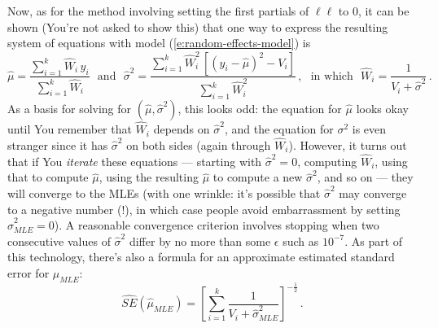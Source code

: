 \documentclass[12pt]{article}
\begin{document}
Now, as for the method involving setting the first partials of $\ell \ell$ to 0, it can be shown (You're not asked to show this) that one way to express the resulting system of equations with model (\ref{e:random-effects-model}) is
\begin{equation} \label{e:score-equations}
\hat{ \mu } = \frac{ \sum_{ i = 1 }^k \hat{ W }_i \, y_i }{ \sum_{ i = 1 }^k \hat{ W }_i } \ \ \ \textrm{and} \ \ \ \hat{ \sigma }^2 = \frac{ \sum_{ i = 1 }^k \hat{ W }_i^2 \, \left[ ( y_i - \hat{ \mu } )^2 - V_i \right] }{ \sum_{ i = 1 }^k \hat{ W }_i^2 } \, , \ \ \ \textrm{in which} \ \ \ \hat{ W }_i = \frac{ 1 }{ V_i + \hat{ \sigma }^2 } \, .
\end{equation}
As a basis for solving for $( \hat{ \mu }, \hat{ \sigma }^2 )$, this looks odd: the equation for $\hat{ \mu }$ looks okay until You remember that $\hat{ W }_i$ depends on $\hat{ \sigma }^2$, and the equation for $\sigma^2$ is even stranger since it has $\hat{ \sigma }^2$ on both sides (again through $\hat{ W }_i$). However, it turns out that if You \textit{iterate} these equations --- starting with $\hat{ \sigma }^2 = 0$, computing $\hat{ W }_i$, using that to compute $\hat{ \mu }$, using the resulting $\hat{ \mu }$ to compute a new $\hat{ \sigma }^2$, and so on --- they will converge to the MLEs (with one wrinkle: it's possible that $\hat{ \sigma }^2$ may converge to a negative number (!), in which case people avoid embarrassment by setting $\hat{ \sigma }_{ MLE }^2 = 0$). A reasonable convergence criterion involves stopping when two consecutive values of $\hat{ \sigma }^2$ differ by no more than some $\epsilon$ such as $10^{ -7 }$. As part of this technology, there's also a formula for an approximate estimated standard error for $\hat{ \mu }_{ MLE }$:
\begin{equation} \label{e:calibrate-mu-mle}
\widehat{ SE } \left( \hat{ \mu }_{ MLE } \right) = \left[ \sum_{ i = 1 }^k \frac{ 1 }{ V_i + \hat{ \sigma }_{ MLE }^2 } \right]^{ - \frac{ 1 }{ 2 } } \, .
\end{equation}
\end{document}
